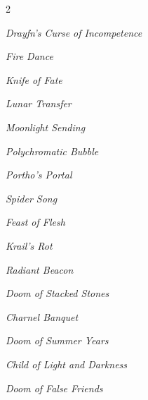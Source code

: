 \documentclass[10pt,a4paper,twoside,bg=print,twocolumn,openany,nodeprecatedcode]{dndbook}
\begin{document}
\begin{description}
\begin{multicols}{2}
\begin{description}
\item \textit{Drayfn's Curse of Incompetence}
\item \textit{Fire Dance}
\item \textit{Knife of Fate}
\item \textit{Lunar Transfer}
\item \textit{Moonlight Sending}
\item \textit{Polychromatic Bubble}
\item \textit{Portho's Portal}
\item \textit{Spider Song}
\end{description}

{\par \vspace { 9pt plus 3pt minus 3pt } \noindent  {} \nopagebreak }

\begin{description}
\item \textit{Feast of Flesh}
\item \textit{Krail's Rot}
\item \textit{Radiant Beacon}
\end{description}

{\par \vspace { 9pt plus 3pt minus 3pt } \noindent  {} \nopagebreak }

\begin{description}
\item \textit{Doom of Stacked Stones}
\end{description}

{\par \vspace { 9pt plus 3pt minus 3pt } \noindent  {} \nopagebreak }

\begin{description}
\item \textit{Charnel Banquet}
\item \textit{Doom of Summer Years}
\end{description}

{\par \vspace { 9pt plus 3pt minus 3pt } \noindent  {} \nopagebreak }

\begin{description}
\item \textit{Child of Light and Darkness}
\item \textit{Doom of False Friends}
\end{description}

\end{multicols}

\end{description}
\end{document}
